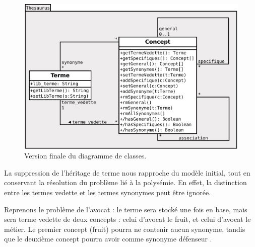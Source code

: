 \begin{figure}[H]
\begin{center}
\includegraphics[width=\textwidth]{files/class_v3}
\end{center}
\caption{Version finale du diagramme de classes.}
\end{figure}

La suppression de l'héritage de terme nous rapproche du modèle initial, tout en conservant la résolution du problème lié à la polysémie. En effet, la distinction entre les termes vedette et les termes synonymes peut être ignorée.

Reprenons le problème de l'\og avocat \fg : le terme sera stocké une fois en base, mais sera terme vedette de deux concepts : celui d'\og avocat \fg le fruit, et celui d'\og avocat \fg le métier. Le premier concept (fruit) pourra ne contenir aucun synonyme, tandis que le deuxième concept pourra avoir comme synonyme \og défenseur \fg{}.